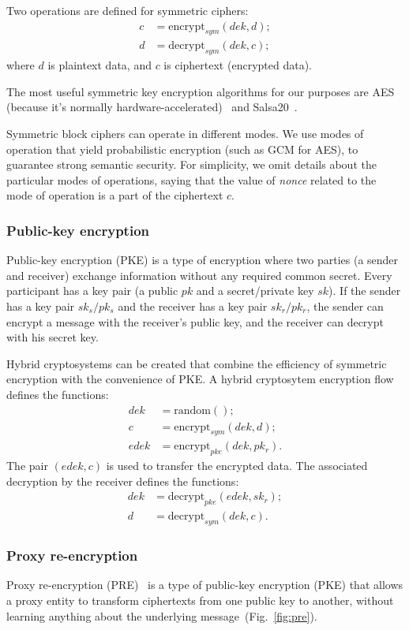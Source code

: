 \documentclass[notitlepage,longbibliography]{revtex4-1}
\begin{document}
Two operations are defined for symmetric ciphers:
\begin{align}
    c &= \text{encrypt}_{sym}(dek, d);\\
    d &= \text{decrypt}_{sym}(dek, c);
\end{align}
where $d$ is plaintext data, and $c$ is ciphertext (encrypted data).

The most useful symmetric key encryption algorithms for our purposes are AES (because it's normally hardware-accelerated)~\cite{wiki:aes}
and Salsa20~\cite{wiki:salsa20}.

Symmetric block ciphers can operate in different modes.
We use modes of operation that yield probabilistic encryption (such as GCM for AES), to guarantee strong semantic security.
For simplicity, we omit details about the particular modes of operations, saying that the value of \emph{nonce} related to the mode of operation is a part of the
ciphertext $c$.

\subsubsection{Public-key encryption}

Public-key encryption (PKE) is a type of encryption where two parties (a sender and receiver) exchange information without any required common secret.
Every participant has a key pair (a public $pk$ and a secret/private key $sk$).
If the sender has a key pair $sk_s/pk_s$ and the receiver has a key pair $sk_r/pk_r$, the sender can encrypt a message with the receiver's public key,
and the receiver can decrypt with his secret key.

Hybrid cryptosystems can be created that combine the efficiency of symmetric encryption with the convenience of PKE.
A hybrid cryptosytem encryption flow defines the functions:
\begin{align}
    dek &= \text{random}();\\
    c &= \text{encrypt}_{sym}(dek, d);\\
    edek &= \text{encrypt}_{pke}(dek, pk_r).
\end{align}
The pair $(edek, c)$ is used to transfer the encrypted data.
The associated decryption by the receiver defines the functions:
\begin{align}
    dek &= \text{decrypt}_{pke}(edek, sk_r);\\
    d &= \text{decrypt}_{sym}(dek, c).
\end{align}

\subsubsection{Proxy re-encryption}
Proxy re-encryption (PRE)~\cite{wiki:pre,phd:nunez} is a type of public-key encryption (PKE) that allows a proxy entity to transform ciphertexts
from one public key to another, without learning anything about the underlying message~(Fig.~\ref{fig:pre}).
\end{document}
